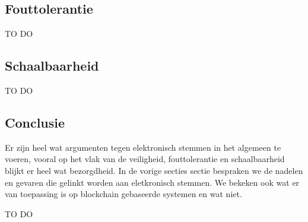 	\subsection{Fouttolerantie}
	TO DO
	\subsection{Schaalbaarheid}
	TO DO

	\subsection{Conclusie} 
		Er zijn heel wat argumenten tegen elektronisch stemmen in het algemeen te voeren, vooral op het vlak van de veiligheid, fouttolerantie en schaalbaarheid blijkt er heel wat bezorgdheid. In de vorige secties sectie bespraken we de nadelen en gevaren die gelinkt worden aan eletkronisch stemmen. We bekeken ook wat er van toepassing is op blockchain gebaseerde systemen en wat niet.
		
		TO DO
		
		
		
		
		
		
	